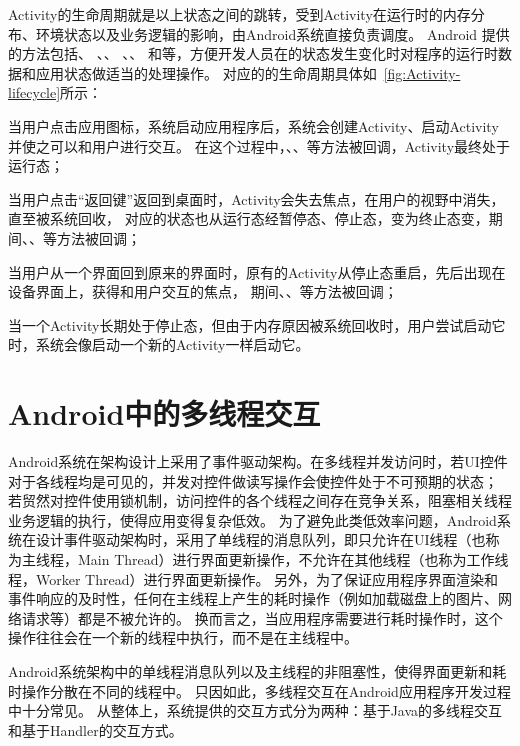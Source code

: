 Activity的生命周期就是以上状态之间的跳转，受到Activity在运行时的内存分布、环境状态以及业务逻辑的影响，由Android系统直接负责调度。
Android 提供的方法包括、 、、 、、 和等，方便开发人员在的状态发生变化时对程序的运行时数据和应用状态做适当的处理操作。
对应的的生命周期具体如~\autoref{fig:Activity-lifecycle}所示：



当用户点击应用图标，系统启动应用程序后，系统会创建Activity、启动Activity并使之可以和用户进行交互。
在这个过程中，、、等方法被回调，Activity最终处于运行态；

当用户点击“返回键”返回到桌面时，Activity会失去焦点，在用户的视野中消失，直至被系统回收，
对应的状态也从运行态经暂停态、停止态，变为终止态变，期间、、等方法被回调；

当用户从一个界面回到原来的界面时，原有的Activity从停止态重启，先后出现在设备界面上，获得和用户交互的焦点，
期间、、等方法被回调；

当一个Activity长期处于停止态，但由于内存原因被系统回收时，用户尝试启动它时，系统会像启动一个新的Activity一样启动它。

\section{Android中的多线程交互}
Android系统在架构设计上采用了事件驱动架构。在多线程并发访问时，若UI控件对于各线程均是可见的，并发对控件做读写操作会使控件处于不可预期的状态；
若贸然对控件使用锁机制，访问控件的各个线程之间存在竞争关系，阻塞相关线程业务逻辑的执行，使得应用变得复杂低效。
为了避免此类低效率问题，Android系统在设计事件驱动架构时，采用了单线程的消息队列，即只允许在UI线程（也称为主线程，Main Thread）进行界面更新操作，不允许在其他线程（也称为工作线程，Worker Thread）进行界面更新操作。
另外，为了保证应用程序界面渲染和事件响应的及时性，任何在主线程上产生的耗时操作（例如加载磁盘上的图片、网络请求等）都是不被允许的。
换而言之，当应用程序需要进行耗时操作时，这个操作往往会在一个新的线程中执行，而不是在主线程中。


Android系统架构中的单线程消息队列以及主线程的非阻塞性，使得界面更新和耗时操作分散在不同的线程中。
只因如此，多线程交互在Android应用程序开发过程中十分常见。
从整体上，系统提供的交互方式分为两种：基于Java的多线程交互和基于Handler的交互方式\cite{androidSourceCode}。

